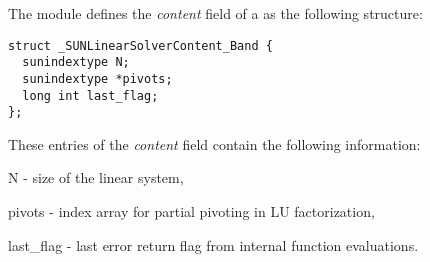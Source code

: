 The {\sunlinsollapband} module defines the \textit{content} field of a
 as the following structure:
\begin{verbatim} 
struct _SUNLinearSolverContent_Band {
  sunindextype N;
  sunindextype *pivots;
  long int last_flag;
};
\end{verbatim}
These entries of the \emph{content} field contain the following
information:
\begin{args}
  \item[N] - size of the linear system,
  \item[pivots] - index array for partial pivoting in LU factorization,
  \item[last\_flag] - last error return flag from internal function evaluations.
\end{args}

